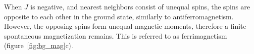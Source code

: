 When $J$ is negative, and nearest neighbors consist of unequal spins, the spins are opposite to each other in the ground state, similarly to antiferromagnetism. However, the opposing spins form unequal magnetic moments, therefore a finite spontaneous magnetization remains. This is referred to as ferrimagnetism (figure~\ref{fig:bg_mag}c).